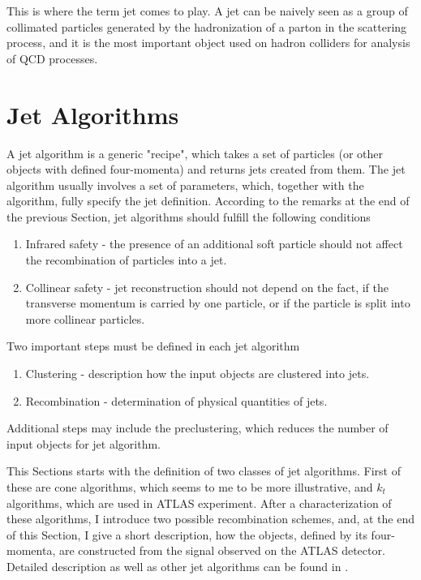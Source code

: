 This is where the term jet comes to play. A jet can be naively seen as a group
of collimated particles generated by the hadronization of a parton in the
scattering process, and it is the most important object used on hadron colliders for
analysis of QCD processes.

\section{Jet Algorithms}

A jet algorithm is a generic "recipe", which takes a set of particles (or other
objects with defined four-momenta) and returns jets created from them. The jet
algorithm usually involves a set of parameters, which, together with the
algorithm, fully specify the jet definition. According to the remarks at the end
of the previous Section, jet algorithms should fulfill the following conditions 

\begin{enumerate}
  \item Infrared safety - the presence of an additional soft particle should not
    affect the recombination of particles into a jet.
  \item Collinear safety - jet reconstruction should not depend on the fact, if
    the transverse momentum is carried by one particle, or if the particle is split
    into more collinear particles.
\end{enumerate}
Two important steps must be defined in each jet algorithm

\begin{enumerate}
  \item Clustering - description how the input objects are clustered into jets.
  \item Recombination - determination of physical quantities of jets.
\end{enumerate}
Additional steps may include the preclustering, which reduces the number of input
objects for jet algorithm.

This Sections starts with the definition of two classes of jet algorithms.
First of these are cone algorithms, which seems to me to be more
illustrative, and $k_t$ algorithms, which are used in ATLAS experiment. After
a characterization of these algorithms, I introduce two possible recombination
schemes, and, at the end of this Section, I give a short description, how the
objects, defined by its four-momenta, are constructed from the signal
observed on the ATLAS detector. Detailed description as well as other jet
algorithms can be found in \cite{ATLASmain,JetDoporuceniZdenek}.


